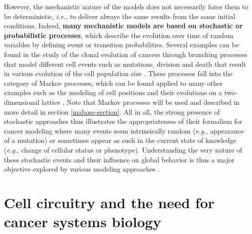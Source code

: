 \documentclass[a4paper,12pt,twoside,onecolumn,openright,final,oldfontcommands]{memoir}
\begin{document}
However, the mechanistic nature of the models does not necessarily force
them to be deterministic, \emph{i.e.}, to deliver always the same
results from the same initial conditions. Indeed, \textbf{many
mechanistic models are based on stochastic or probabilistic processes},
which describe the evolution over time of random variables by defining
event or transition probabilities. Several examples can be found in the
study of the clonal evolution of cancers through branching processes
that model different cell events such as mutations, division and death
that result in various evolution of the cell population size
\citep{durrett2015branching, haeno2012computational}. These processes
fall into the category of Markov processes, which can be found applied
to many other examples such as the modeling of cell positions and their
evolutions on a two-dimensional lattice \citep{anderson2006tumor}. Note
that Markov processes will be used and described in more detail in
section \ref{maboss-section}. All in all, the strong presence of
stochastic approaches thus illustrates the appropriateness of their
formalism for cancer modeling where many events seem intrinsically
random (\emph{e.g.}, appearance of a mutation) or sometimes appear as
such in the current state of knowledge (\emph{e.g.}, change of cellular
status or phenotype). Understanding the very nature of these stochastic
events and their influence on global behavior is thus a major objective
explored by various modeling approaches
\citep{gupta2011stochastic, baar2016stochastic}.

\section{Cell circuitry and the need for cancer systems
biology}\label{cell-circuitry-and-the-need-for-cancer-systems-biology}
\end{document}
